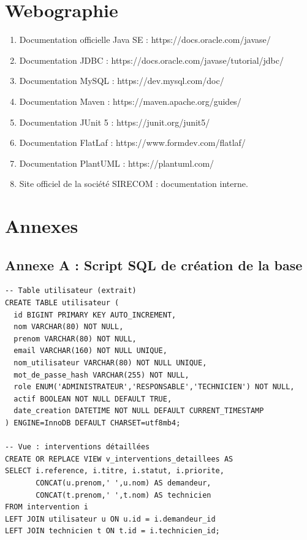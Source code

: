 \documentclass[11pt,a4paper]{report}
\begin{document}
\chapter*{Webographie}
\begin{enumerate}
  \item Documentation officielle Java SE : https://docs.oracle.com/javase/
  \item Documentation JDBC : https://docs.oracle.com/javase/tutorial/jdbc/
  \item Documentation MySQL : https://dev.mysql.com/doc/
  \item Documentation Maven : https://maven.apache.org/guides/
  \item Documentation JUnit 5 : https://junit.org/junit5/
  \item Documentation FlatLaf : https://www.formdev.com/flatlaf/
  \item Documentation PlantUML : https://plantuml.com/
  \item Site officiel de la société SIRECOM : documentation interne.
\end{enumerate}
\chapter*{Annexes}
\section*{Annexe A : Script SQL de création de la base}
\begin{lstlisting}
-- Table utilisateur (extrait)
CREATE TABLE utilisateur (
  id BIGINT PRIMARY KEY AUTO_INCREMENT,
  nom VARCHAR(80) NOT NULL,
  prenom VARCHAR(80) NOT NULL,
  email VARCHAR(160) NOT NULL UNIQUE,
  nom_utilisateur VARCHAR(80) NOT NULL UNIQUE,
  mot_de_passe_hash VARCHAR(255) NOT NULL,
  role ENUM('ADMINISTRATEUR','RESPONSABLE','TECHNICIEN') NOT NULL,
  actif BOOLEAN NOT NULL DEFAULT TRUE,
  date_creation DATETIME NOT NULL DEFAULT CURRENT_TIMESTAMP
) ENGINE=InnoDB DEFAULT CHARSET=utf8mb4;

-- Vue : interventions détaillées
CREATE OR REPLACE VIEW v_interventions_detaillees AS
SELECT i.reference, i.titre, i.statut, i.priorite,
       CONCAT(u.prenom,' ',u.nom) AS demandeur,
       CONCAT(t.prenom,' ',t.nom) AS technicien
FROM intervention i
LEFT JOIN utilisateur u ON u.id = i.demandeur_id
LEFT JOIN technicien t ON t.id = i.technicien_id;
\end{lstlisting}
\end{document}
